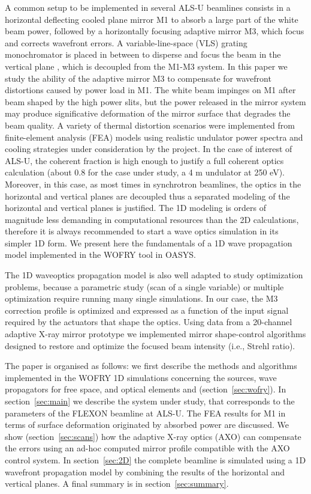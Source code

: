 \documentclass[preprint]{iucr}              %
\begin{document}
A common setup to be implemented in several ALS-U beamlines consists in a horizontal deflecting cooled plane mirror M1 to absorb a large part of the white beam power, followed by a horizontally focusing adaptive mirror M3, which focus and corrects wavefront errors. A variable-line-space (VLS) grating monochromator is placed in between to disperse and focus the beam in the vertical plane \cite{reininger2005}, which is decoupled from the M1-M3 system. In this paper we study the ability of the adaptive mirror M3 to compensate for wavefront distortions caused by power load in M1. The white beam impinges on M1 after beam shaped by the high power slits, but the power released in the mirror system may produce significative deformation of the mirror surface that degrades the beam quality. 
A variety of thermal distortion scenarios were implemented from finite-element analysis (FEA) models using realistic undulator power spectra and cooling strategies under consideration by the project.
In the case of interest of ALS-U, the coherent fraction is high enough  to justify a full coherent optics calculation (about 0.8 for the case under study, a 4 m undulator at 250 eV). Moreover, in this case, as most times in synchrotron beamlines, the optics in the horizontal and vertical planes are decoupled thus a separated modeling of the horizontal and vertical planes is justified. The 1D modeling is orders of magnitude less demanding in computational resources than the 2D calculations, therefore it is always recommended to start a wave optics simulation in its simpler 1D form. We present here the fundamentals of a 1D wave propagation model implemented in the WOFRY \cite{codeWOFRY} tool in OASYS. 

The 1D waveoptics propagation model is also well adapted to study optimization problems, because a parametric study (scan of a single variable) or multiple optimization require running many single simulations. In our case, the M3 correction profile is optimized and expressed as a function of the input signal required by the actuators that shape the optics. 
Using data from a 20-channel adaptive X-ray mirror prototype we implemented mirror shape-control algorithms designed to restore and optimize the focused beam intensity (i.e., Strehl ratio).

The paper is organised as follows: we first describe the methods and algorithms implemented in the WOFRY 1D simulations concerning the sources, wave propagators for free space, and optical elements and (section~\ref{sec:wofry}). In section~\ref{sec:main} we describe the system under study, that corresponds to the parameters of the FLEXON beamline at ALS-U. The FEA results for M1 in terms of surface deformation originated by absorbed power are discussed. We show (section~\ref{sec:scans}) how the adaptive X-ray optics (AXO) can compensate the errors using an ad-hoc computed mirror profile compatible with the AXO control system. In section~\ref{sec:2D} the complete beamline is simulated using a 1D wavefront propagation model by combining the results of the horizontal and vertical planes. A final summary is in section~\ref{sec:summary}.
\end{document}
